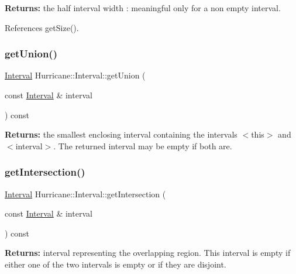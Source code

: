 {\bfseries Returns\+:} the half interval width \+: meaningful only for a non empty interval. 

References get\+Size().

\mbox{\label{classHurricane_1_1Interval_ac50b0e28faf03b54f81af109d942b569}} 
\subsubsection{\texorpdfstring{get\+Union()}{getUnion()}}
{\footnotesize\ttfamily \mbox{\hyperlink{classHurricane_1_1Interval}{Interval}} Hurricane\+::\+Interval\+::get\+Union (\begin{DoxyParamCaption}\item[{const \mbox{\hyperlink{classHurricane_1_1Interval}{Interval}} \&}]{interval }\end{DoxyParamCaption}) const}

{\bfseries Returns\+:} the smallest enclosing interval containing the intervals {\ttfamily $<$this$>$} and {\ttfamily $<$interval$>$}. The returned interval may be empty if both are. \mbox{\label{classHurricane_1_1Interval_a73130b484cf43ff3b48488780a926ead}} 
\subsubsection{\texorpdfstring{get\+Intersection()}{getIntersection()}}
{\footnotesize\ttfamily \mbox{\hyperlink{classHurricane_1_1Interval}{Interval}} Hurricane\+::\+Interval\+::get\+Intersection (\begin{DoxyParamCaption}\item[{const \mbox{\hyperlink{classHurricane_1_1Interval}{Interval}} \&}]{interval }\end{DoxyParamCaption}) const}

{\bfseries Returns\+:} interval representing the overlapping region. This interval is empty if either one of the two intervals is empty or if they are disjoint. \mbox{\label{classHurricane_1_1Interval_a5bf0292743d02f861a194c48c823c7ce}} 
